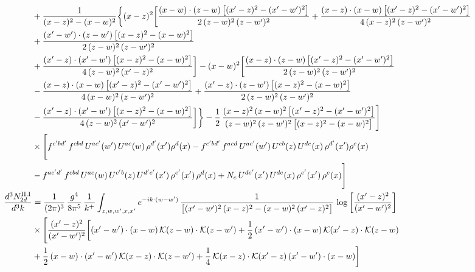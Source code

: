 \documentclass[9pt]{article}
\numberwithin{equation}{section}
\begin{document}
\begin{align}
&+\frac{1}{(x-z)^{2}-(x-w)^{2}}\bigg\{(x-z)^{2}\bigg[\frac{(x-w)\cdot(z-w)\,\big[(x^{\prime}-z)^{2}-(x^{\prime}-w^{\prime})^{2}\big]}{2\,(z-w)^{2}\,(z-w^{\prime})^{2}}+\frac{(x-z)\cdot(x-w)\,\big[(x^{\prime}-z)^{2}-(x^{\prime}-w^{\prime})^{2}\big]}{4\,(x-z)^{2}\,(z-w^{\prime})^{2}}\notag\\ &+\frac{(x^{\prime}-w^{\prime})\cdot(z-w^{\prime})\,\big[(x-z)^{2}-(x-w)^{2}\big]}{2\,(z-w)^{2}\,(z-w^{\prime})^{2}}\notag \\ & +\frac{(x^{\prime}-z)\cdot(x^{\prime}-w^{\prime})\,\big[(x-z)^{2}-(x-w)^{2}\big]}{4\,(z-w)^{2}\,(x^{\prime}-z)^{2}}\bigg]-(x-w)^{2}\bigg[\frac{(x-z)\cdot(z-w)\,\big[(x^{\prime}-z)^{2}-(x^{\prime}-w^{\prime})^{2}\big]}{2\,(z-w)^{2}\,(z-w^{\prime})^{2}}\notag \\ & -\frac{(x-z)\cdot(x-w)\,\big[(x^{\prime}-z)^{2}-(x^{\prime}-w^{\prime})^{2}\big]}{4\,(x-w)^{2}\,(z-w^{\prime})^{2}}+\frac{(x^{\prime}-z)\cdot(z-w^{\prime})\,\big[(x-z)^{2}-(x-w)^{2}\big]}{2\,(z-w)^{2}\,(z-w^{\prime})^{2}}\notag \\ & -\frac{(x^{\prime}-z)\cdot(x^{\prime}-w^{\prime})\,\big[(x-z)^{2}-(x-w)^{2}\big]}{4\,(z-w)^{2}\,(x^{\prime}-w^{\prime})^{2}}\bigg]\bigg\}-\frac{1}{2}\,\frac{(x-z)^{2}\,(x-w)^{2}\,\big[(x^{\prime}-z)^{2}-(x^{\prime}-w^{\prime})^{2}\big]}{(z-w)^{2}\,(z-w^{\prime})^{2}\,\big[(x-z)^{2}-(x-w)^{2}\big]}\Bigg]\notag\\
&\times\Bigg[f^{c^{\prime}bd^{\prime}}\,f^{cbd}\, U^{ac^{\prime}}(w^{\prime})\,U^{ac}(w)\,\rho^{d^{\prime}}(x^{\prime})\rho^{d}(x)- f^{c^{\prime}bd^{\prime}}\,f^{acd}\,U^{ac^{\prime}}(w^{\prime})\,U^{cb}(z)\,U^{de}(x)\,\rho^{d^{\prime}}(x^{\prime})\rho^{e}(x) \notag \\ & -f^{ac^{\prime}d^{\prime}}\,f^{cbd}\,U^{ac}(w)\,U^{c^{\prime}b}(z)\,U^{d^{\prime}e^{\prime}}(x^{\prime})\,\rho^{e^{\prime}}(x^{\prime})\,\rho^{d}(x) +N_{c}\,U^{de^{\prime}}(x^{\prime})\,U^{de}(x)\,\rho^{e^{\prime}}(x^{\prime})\,\rho^{e}(x)\Bigg]\\
\frac{d^{3}N^{\rm II.I}_{2d}}{d^{3}k}&= \frac{1}{(2\pi)^{3}}\,\frac{g^{4}}{8\pi^{5}}\,\frac{1}{k^{+}}\int_{z,w,w^{\prime},x,x^{\prime}}e^{-ik\cdot{(w-w^{\prime})}}\,\frac{1}{\big[(x^{\prime}-w^{\prime})^{2}\,(x-z)^{2}-(x-w)^{2}\,(x^{\prime}-z)^{2}\big]}\,\log\left[\frac{(x^{\prime}-z)^{2}}{(x^{\prime}-w^{\prime})^{2}}\right]\notag\\
&\times\Bigg[\frac{(x^{\prime}-z)^{2}}{(x^{\prime}-w^{\prime})^{2}}\bigg[(x^{\prime}-w^{\prime})\cdot(x-w)\,\mathcal{K}(z-w)\cdot\mathcal{K}(z-w^{\prime})+\frac{1}{2}\,(x^{\prime}-w^{\prime})\cdot(x-w)\,\mathcal{K}(x^{\prime}-z)\cdot\mathcal{K}(z-w)\notag \\ & +\frac{1}{2}\,(x-w)\cdot(x^{\prime}-w^{\prime})\,\mathcal{K}(x-z)\cdot\mathcal{K}(z-w^{\prime})+\frac{1}{4}\,\mathcal{K}(x-z)\cdot\mathcal{K}(x^{\prime}-z)\,(x^{\prime}-w^{\prime})\cdot(x-w)\bigg]\notag\\

\end{align}
\end{document}
